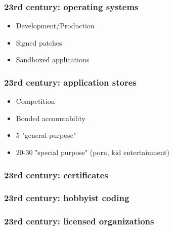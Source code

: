 
\begin{frame}[fragile]
\frametitle{23rd century: operating systems}

\begin{itemize}
\item Development/Production
\item Signed patches
\item Sandboxed applications
\end{itemize}

\end{frame}

\begin{frame}[fragile]
\frametitle{23rd century: application stores}

\begin{itemize}
\item Competition
\item Bonded accountability
\item 5 "general purpose"
\item 20-30 "special purpose" (porn, kid entertainment)
\end{itemize}

\end{frame}

\begin{frame}[fragile]
\frametitle{23rd century: certificates}

\end{frame}

\begin{frame}[fragile]
\frametitle{23rd century: hobbyist coding}

\end{frame}

\begin{frame}[fragile]
\frametitle{23rd century: licensed organizations}

\end{frame}


